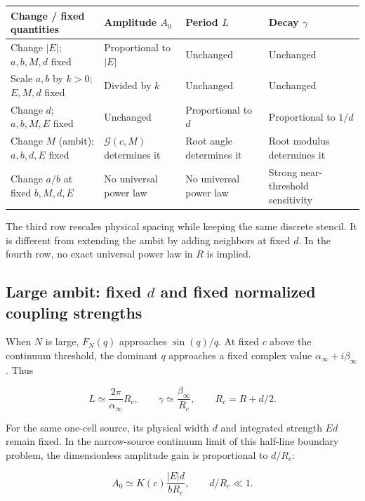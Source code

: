 \documentclass[10pt,a4paper]{article}
\begin{document}
{
\small
\begin{tabularx}{\textwidth}{@{}
  p{}YYY@{}}
\toprule
\textbf{Change / fixed quantities}
&
\textbf{Amplitude $A_0$}
&
\textbf{Period $L$}
&
\textbf{Decay $\gamma$}
\\
\midrule
Change $|E|$; $a,b,M,d$ fixed
&
Proportional to $|E|$
&
Unchanged
&
Unchanged
\\
\addlinespace
Scale $a,b$ by $k>0$; $E,M,d$ fixed
&
Divided by $k$
&
Unchanged
&
Unchanged
\\
\addlinespace
Change $d$; $a,b,M,E$ fixed
&
Unchanged
&
Proportional to $d$
&
Proportional to $1/d$
\\
\addlinespace
Change $M$ (ambit); $a,b,d,E$ fixed
&
$\mathcal G(c,M)$ determines it
&
Root angle determines it
&
Root modulus determines it
\\
\addlinespace
Change $a/b$ at fixed $b,M,d,E$
&
No universal power law
&
No universal power law
&
Strong near-threshold sensitivity
\\
\bottomrule
\end{tabularx}\par
}

The third row rescales physical spacing while
keeping the same discrete stencil.
It is different from extending the ambit by
adding neighbors at fixed $d$.
In the fourth row, no exact universal power law
in $R$ is implied.

\subsection*{Large ambit: fixed $d$ and fixed normalized
coupling strengths}

When $N$ is large, $F_N(q)$ approaches $\sin(q)/q$.
At fixed $c$ above the continuum threshold,
the dominant $q$ approaches a fixed complex value
$\alpha_\infty+i\beta_\infty$.
Thus

\begin{equation}
L\simeq\frac{2\pi}{\alpha_\infty}R_c,
\qquad
\gamma\simeq\frac{\beta_\infty}{R_c},
\qquad
R_c=R+d/2.
\end{equation}

For the same one-cell source, its physical width
$d$ and integrated strength $Ed$ remain fixed.
In the narrow-source continuum limit of this
half-line boundary problem, the dimensionless
amplitude gain is proportional to $d/R_c$:

\begin{equation}
A_0
\simeq
K(c)\frac{|E|d}{bR_c},
\qquad
d/R_c\ll 1.
\end{equation}
\end{document}

